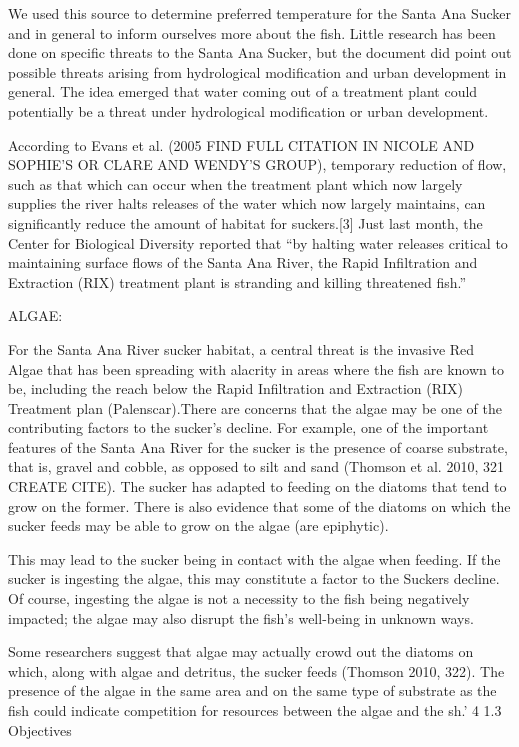 \documentclass{article}
\begin{document}
We used this source to determine preferred temperature for the Santa Ana Sucker and in general to inform ourselves more about the fish. Little research has been done on specific threats to the Santa Ana Sucker, but the document did point out possible threats arising from hydrological modification and urban development in general. The idea emerged that water coming out of a treatment plant could potentially be a threat under hydrological modification or urban development.


According to Evans et al. (2005 FIND FULL CITATION IN NICOLE AND SOPHIE'S OR CLARE AND WENDY'S GROUP), temporary reduction of flow, such as that which can occur when the treatment plant which now largely supplies the river halts releases of the water which now largely maintains, can significantly reduce the amount of habitat for suckers.[3] Just last month, the Center for Biological Diversity reported that “by halting water releases critical to maintaining surface flows of the Santa Ana River, the Rapid Infiltration and Extraction (RIX) treatment plant is stranding and killing threatened fish.” 

ALGAE: 

For the Santa Ana River sucker habitat, a central threat is the invasive Red Algae that has been spreading with alacrity in areas where the fish are known to be, including the reach below the Rapid Infiltration and Extraction (RIX) Treatment plan (Palenscar).There are concerns that the algae may be one of the contributing factors to the sucker's decline. For example, one of the important features of the Santa Ana River for the sucker is the presence of coarse substrate, that is, gravel and cobble, as opposed to silt and sand (Thomson et al. 2010, 321 CREATE CITE). The sucker has adapted to feeding on the diatoms that tend to grow on the former. There is also evidence that some of the diatoms on which the sucker feeds may be able to grow on the algae (are epiphytic). 

This may lead to the sucker being in contact with the algae when feeding. If the sucker is ingesting the algae, this may constitute a factor to the Suckers decline. Of course, ingesting the algae is not a necessity to the fish being negatively impacted; the algae may also disrupt the fish's well-being in unknown ways. 

Some researchers suggest that algae may actually crowd out the diatoms on which, along with algae and detritus, the sucker feeds (Thomson 2010, 322). The presence of the algae in the same area and on the same type of substrate as the fish could indicate competition for resources between the algae and the sh.' 4 1.3 Objectives
\end{document}

